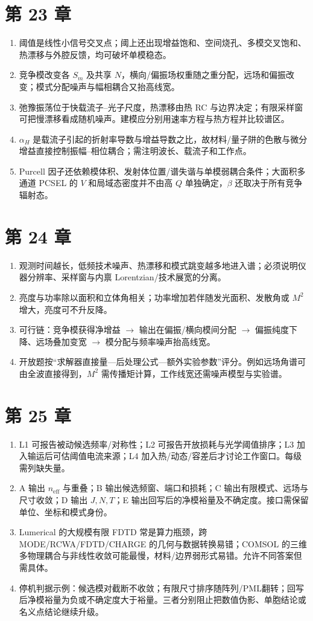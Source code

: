 \section{第 23 章}
\begin{enumerate}
  \item 阈值是线性小信号交叉点；阈上还出现增益饱和、空间烧孔、多模交叉饱和、热漂移与外腔反馈，均可破坏单模稳态。
  \item 竞争模改变各 $S_m$ 及共享 $N$，横向/偏振场权重随之重分配，远场和偏振改变；模式分配噪声与幅相耦合又抬高线宽。
  \item 弛豫振荡位于快载流子--光子尺度，热漂移由热 RC 与边界决定；有限采样窗可把慢漂移看成随机噪声。建模应分别用速率方程与热方程并比较谱区。
  \item $\alpha_H$ 是载流子引起的折射率导数与增益导数之比，故材料/量子阱的色散与微分增益直接控制振幅--相位耦合；需注明波长、载流子和工作点。
  \item Purcell 因子还依赖模体积、发射体位置/谱失谐与单模弱耦合条件；大面积多通道 PCSEL 的 $V$ 和局域态密度并不由高 $Q$ 单独确定，$\beta$ 还取决于所有竞争辐射态。
\end{enumerate}

\section{第 24 章}
\begin{enumerate}
  \item 观测时间越长，低频技术噪声、热漂移和模式跳变越多地进入谱；必须说明仪器分辨率、采样窗与内禀 Lorentzian/技术展宽的分离。
  \item 亮度与功率除以面积和立体角相关；功率增加若伴随发光面积、发散角或 $M^2$ 增大，亮度可不升反降。
  \item 可行链：竞争模获得净增益 $\to$ 输出在偏振/横向模间分配 $\to$ 偏振纯度下降、远场叠加变宽 $\to$ 模分配与频率噪声抬高线宽。
  \item 开放题按“求解器直接量—后处理公式—额外实验参数”评分。例如远场角谱可由全波直接得到，$M^2$ 需传播矩计算，工作线宽还需噪声模型与实验谱。
\end{enumerate}

\section{第 25 章}
\begin{enumerate}
  \item L1 可报告被动候选频率/对称性；L2 可报告开放损耗与光学阈值排序；L3 加入输运后可估阈值电流来源；L4 加入热/动态/容差后才讨论工作窗口。每级需列缺失量。
  \item A 输出 $n_{\mathrm{eff}}$ 与重叠；B 输出候选频窗、端口和损耗；C 输出有限模式、远场与尺寸收敛；D 输出 $J,N,T$；E 输出回写后的净模裕量及不确定度。接口需保留单位、坐标和模式身份。
  \item Lumerical 的大规模有限 FDTD 常是算力瓶颈，跨 MODE/RCWA/FDTD/CHARGE 的几何与数据转换易错；COMSOL 的三维多物理耦合与非线性收敛可能最慢，材料/边界弱形式易错。允许不同答案但需具体。
  \item 停机判据示例：候选模对截断不收敛；有限尺寸排序随阵列/PML翻转；回写后净模裕量为负或不确定度大于裕量。三者分别阻止把数值伪影、单胞结论或名义点结论继续升级。
\end{enumerate}

